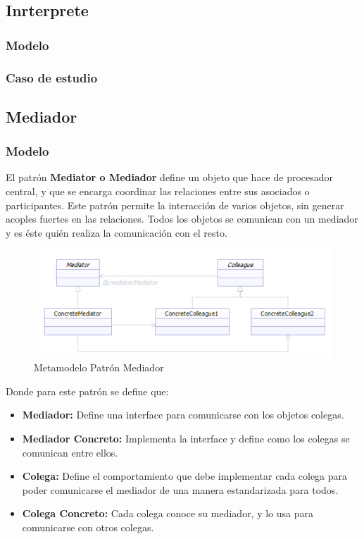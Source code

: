 \newpage

\subsection{Inrterprete}
\subsubsection{Modelo}
\newpage
\subsubsection{Caso de estudio}
\newpage

\subsection{Mediador}

\subsubsection{Modelo}
El patrón \textbf{Mediator o Mediador} define un objeto que hace de procesador central, y que se encarga coordinar las relaciones entre sus asociados o participantes. Este patrón permite la interacción de varios objetos, sin generar acoples fuertes en las relaciones. Todos los objetos se comunican con un mediador y es éste quién realiza la comunicación con el resto.

\begin{figure}[th!]
	\centering
	\includegraphics[width=0.8\linewidth]{arquitectura/imagenes/modeloMediador}
	\caption{Metamodelo Patrón Mediador}
	\label{fig:metamodelo patron mediador}
\end{figure}

Donde para este patrón se define que:
\begin{itemize}
	\item \textbf{Mediador: }Define una interface para comunicarse con los objetos colegas.
	\item \textbf{Mediador Concreto: }Implementa la interface y define como los colegas se comunican entre ellos.
	\item \textbf{Colega: }Define el comportamiento que debe implementar cada colega para poder comunicarse el mediador de una manera estandarizada para todos.
	\item \textbf{Colega Concreto: }Cada colega conoce su mediador, y lo usa para comunicarse con otros colegas.
\end{itemize}

